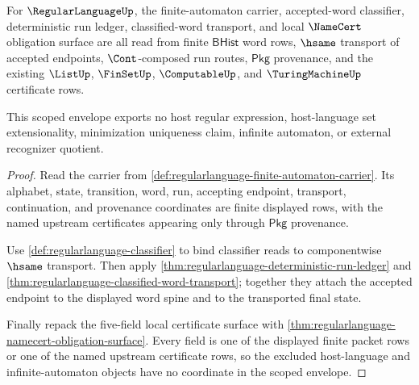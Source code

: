 \begin{theorem}
\label{thm:regularlanguage-scoped-kernel-dependency-envelope}
For $\RegularLanguageUp$, the finite-automaton carrier, accepted-word
classifier, deterministic run ledger, classified-word transport, and local
$\NameCert$ obligation surface are all read from finite $\mathsf{BHist}$ word
rows, $\hsame$ transport of accepted endpoints, $\Cont$-composed run routes,
$\mathsf{Pkg}$ provenance, and the existing $\ListUp$, $\FinSetUp$,
$\ComputableUp$, and $\TuringMachineUp$ certificate rows.

This scoped envelope exports no host regular expression, host-language set
extensionality, minimization uniqueness claim, infinite automaton, or external
recognizer quotient.
\end{theorem}
\begin{proof}
Read the carrier from
\autoref{def:regularlanguage-finite-automaton-carrier}. Its alphabet, state,
transition, word, run, accepting endpoint, transport, continuation, and
provenance coordinates are finite displayed rows, with the named upstream
certificates appearing only through $\mathsf{Pkg}$ provenance.

Use \autoref{def:regularlanguage-classifier} to bind classifier reads to
componentwise $\hsame$ transport. Then apply
\autoref{thm:regularlanguage-deterministic-run-ledger} and
\autoref{thm:regularlanguage-classified-word-transport}; together they attach
the accepted endpoint to the displayed word spine and to the transported final
state.

Finally repack the five-field local certificate surface with
\autoref{thm:regularlanguage-namecert-obligation-surface}. Every field is one
of the displayed finite packet rows or one of the named upstream certificate
rows, so the excluded host-language and infinite-automaton objects have no
coordinate in the scoped envelope.
\end{proof}

